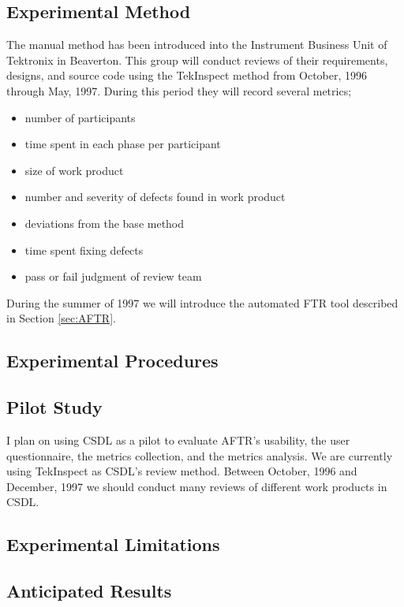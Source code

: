 \subsection{Experimental Method}
The manual method has been introduced into the Instrument Business Unit of
Tektronix in Beaverton.  This group will conduct reviews of their
requirements, designs, and source code using the TekInspect method from
October, 1996 through May, 1997.  During this period they will record
several metrics;
\begin{itemize}
\item{number of participants}
\item{time spent in each phase per participant}
\item{size of work product}
\item{number and severity of defects found in work product}
\item{deviations from the base method}
\item{time spent fixing defects}
\item{pass or fail judgment of review team}
\end{itemize}

During the summer of 1997 we will introduce the automated FTR tool
described in Section \ref{sec:AFTR}.

\subsection{Experimental Procedures}

\subsection{Pilot Study}

I plan on using CSDL as a pilot to evaluate AFTR's usability, the user
questionnaire, the metrics collection, and the metrics analysis.  We are
currently using TekInspect as CSDL's review method.  Between October, 1996
and December, 1997 we should conduct many reviews of different work
products in CSDL.  




\subsection{Experimental Limitations}
\subsection{Anticipated Results}
